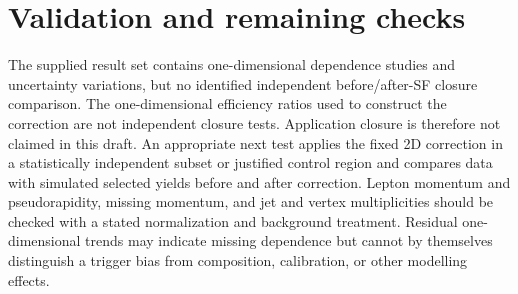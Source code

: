 \section{Validation and remaining checks}\label{sec:closure}
The supplied result set contains one-dimensional dependence studies and uncertainty variations, but no identified independent before/after-SF closure comparison. The one-dimensional efficiency ratios used to construct the correction are not independent closure tests. Application closure is therefore not claimed in this draft.
An appropriate next test applies the fixed 2D correction in a statistically independent subset or justified control region and compares data with simulated selected yields before and after correction. Lepton momentum and pseudorapidity, missing momentum, and jet and vertex multiplicities should be checked with a stated normalization and background treatment. Residual one-dimensional trends may indicate missing dependence but cannot by themselves distinguish a trigger bias from composition, calibration, or other modelling effects.
